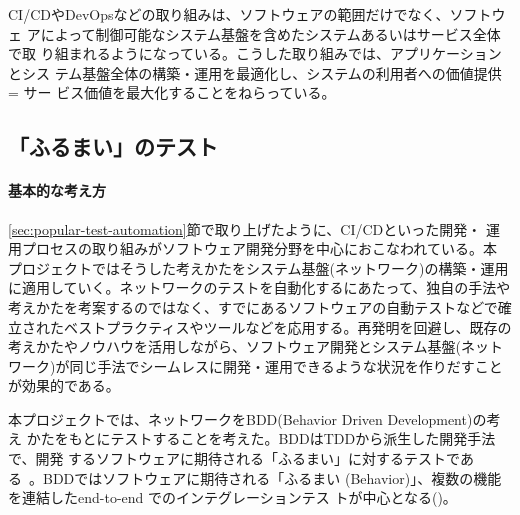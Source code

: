 CI/CDやDevOpsなどの取り組みは、ソフトウェアの範囲だけでなく、ソフトウェ
アによって制御可能なシステム基盤を含めたシステムあるいはサービス全体で取
り組まれるようになっている。こうした取り組みでは、アプリケーションとシス
テム基盤全体の構築・運用を最適化し、システムの利用者への価値提供 = サー
ビス価値を最大化することをねらっている。

  \subsection{「ふるまい」のテスト}
  \label{sec:behavior-test}


    \paragraph{基本的な考え方}
\ref{sec:popular-test-automation}節で取り上げたように、CI/CDといった開発・
運用プロセスの取り組みがソフトウェア開発分野を中心におこなわれている。本
プロジェクトではそうした考えかたをシステム基盤(ネットワーク)の構築・運用
に適用していく。ネットワークのテストを自動化するにあたって、独自の手法や
考えかたを考案するのではなく、すでにあるソフトウェアの自動テストなどで確
立されたベストプラクティスやツールなどを応用する。再発明を回避し、既存の
考えかたやノウハウを活用しながら、ソフトウェア開発とシステム基盤(ネット
ワーク)が同じ手法でシームレスに開発・運用できるような状況を作りだすこと
が効果的である。

本プロジェクトでは、ネットワークをBDD(Behavior Driven Development)の考え
かたをもとにテストすることを考えた。BDDはTDDから派生した開発手法で、開発
するソフトウェアに期待される「ふるまい」に対するテストであ
る~\cite{wikipedia-bdd}。BDDではソフトウェアに期待される「ふるまい
(Behavior)」、複数の機能を連結したend-to-end でのインテグレーションテス
トが中心となる()。

